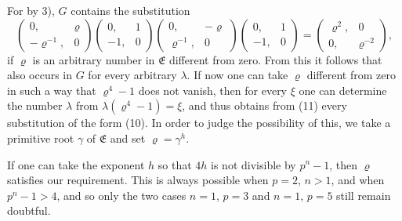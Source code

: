 For by 3), $G$ contains the substitution
\[
\begin{pmatrix} 0, & \varrho \\ -\varrho^{-1}, & 0 \end{pmatrix}\begin{pmatrix} 0, & 1 \\ -1, & 0 \end{pmatrix}\begin{pmatrix} 0, & -\varrho \\ \varrho^{-1}, & 0 \end{pmatrix}\begin{pmatrix} 0, & 1 \\ -1, & 0 \end{pmatrix} = \begin{pmatrix} \varrho^2, & 0 \\ 0, & \varrho^{-2} \end{pmatrix},
\]
if $\varrho$ is an arbitrary number in $\mathfrak{E}$ different from zero. From this it follows that
also occurs in $G$ for every arbitrary $\lambda$. If now one can take $\varrho$ different from zero in such a way that $\varrho^4-1$ does not vanish, then for every $\xi$ one can determine the number $\lambda$ from $\lambda(\varrho^4-1)=\xi$, and thus obtains from (11) every substitution of the form (10). In order to judge the possibility of this, we take a primitive root $\gamma$ of $\mathfrak{E}$ and set $\varrho=\gamma^h$.

If one can take the exponent $h$ so that $4h$ is not divisible by $p^n-1$, then $\varrho$ satisfies our requirement. This is always possible when $p=2$, $n>1$, and when $p^n-1>4$, and so only the two cases $n=1$, $p=3$ and $n=1$, $p=5$ still remain doubtful.
